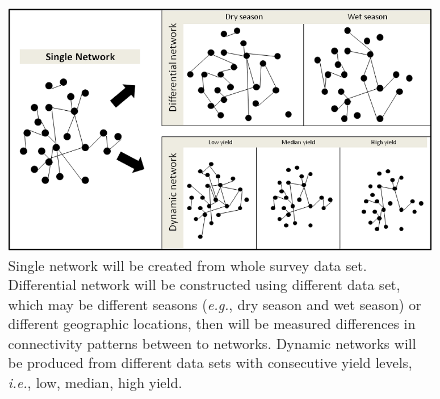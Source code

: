 \newpage
\begin{landscape}
\begin{figure}
\centering
\includegraphics[width=9in]{wholenet}
\caption[Network comparison]{Single network will be created from whole survey data set. Differential network will be constructed using different data set, which may be different seasons (\textit{e.g.}, dry season and wet season) or different geographic locations, then will be measured differences in connectivity patterns between to networks. Dynamic networks will be produced from different data sets with consecutive yield levels, \textit{i.e.}, low, median, high yield.}
\end{figure}
\end{landscape}

